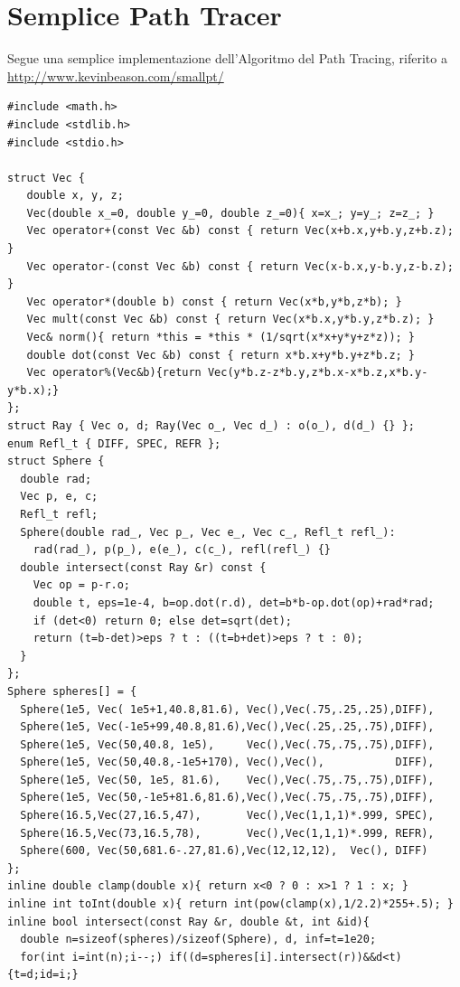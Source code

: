 \section{Semplice Path Tracer}
Segue una semplice implementazione dell'Algoritmo del Path Tracing, riferito a 
\href{http://www.kevinbeason.com/smallpt/}{http://www.kevinbeason.com/smallpt/}
\begin{verbatim}
#include <math.h>   
#include <stdlib.h> 
#include <stdio.h>  

struct Vec {        
   double x, y, z;                  
   Vec(double x_=0, double y_=0, double z_=0){ x=x_; y=y_; z=z_; } 
   Vec operator+(const Vec &b) const { return Vec(x+b.x,y+b.y,z+b.z); } 
   Vec operator-(const Vec &b) const { return Vec(x-b.x,y-b.y,z-b.z); } 
   Vec operator*(double b) const { return Vec(x*b,y*b,z*b); } 
   Vec mult(const Vec &b) const { return Vec(x*b.x,y*b.y,z*b.z); } 
   Vec& norm(){ return *this = *this * (1/sqrt(x*x+y*y+z*z)); } 
   double dot(const Vec &b) const { return x*b.x+y*b.y+z*b.z; } 
   Vec operator%(Vec&b){return Vec(y*b.z-z*b.y,z*b.x-x*b.z,x*b.y-y*b.x);} 
}; 
struct Ray { Vec o, d; Ray(Vec o_, Vec d_) : o(o_), d(d_) {} }; 
enum Refl_t { DIFF, SPEC, REFR };  
struct Sphere { 
  double rad;       
  Vec p, e, c;      
  Refl_t refl;      
  Sphere(double rad_, Vec p_, Vec e_, Vec c_, Refl_t refl_): 
    rad(rad_), p(p_), e(e_), c(c_), refl(refl_) {} 
  double intersect(const Ray &r) const { 
    Vec op = p-r.o; 
    double t, eps=1e-4, b=op.dot(r.d), det=b*b-op.dot(op)+rad*rad; 
    if (det<0) return 0; else det=sqrt(det); 
    return (t=b-det)>eps ? t : ((t=b+det)>eps ? t : 0); 
  } 
}; 
Sphere spheres[] = {
  Sphere(1e5, Vec( 1e5+1,40.8,81.6), Vec(),Vec(.75,.25,.25),DIFF),
  Sphere(1e5, Vec(-1e5+99,40.8,81.6),Vec(),Vec(.25,.25,.75),DIFF),
  Sphere(1e5, Vec(50,40.8, 1e5),     Vec(),Vec(.75,.75,.75),DIFF),
  Sphere(1e5, Vec(50,40.8,-1e5+170), Vec(),Vec(),           DIFF),
  Sphere(1e5, Vec(50, 1e5, 81.6),    Vec(),Vec(.75,.75,.75),DIFF),
  Sphere(1e5, Vec(50,-1e5+81.6,81.6),Vec(),Vec(.75,.75,.75),DIFF),
  Sphere(16.5,Vec(27,16.5,47),       Vec(),Vec(1,1,1)*.999, SPEC),
  Sphere(16.5,Vec(73,16.5,78),       Vec(),Vec(1,1,1)*.999, REFR),
  Sphere(600, Vec(50,681.6-.27,81.6),Vec(12,12,12),  Vec(), DIFF) 
}; 
inline double clamp(double x){ return x<0 ? 0 : x>1 ? 1 : x; } 
inline int toInt(double x){ return int(pow(clamp(x),1/2.2)*255+.5); } 
inline bool intersect(const Ray &r, double &t, int &id){ 
  double n=sizeof(spheres)/sizeof(Sphere), d, inf=t=1e20; 
  for(int i=int(n);i--;) if((d=spheres[i].intersect(r))&&d<t){t=d;id=i;} 

\end{verbatim}
